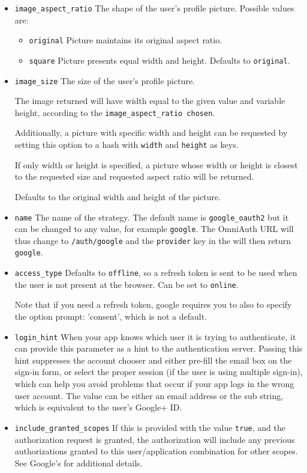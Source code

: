 \begin{itemize}
\item \verb|image_aspect_ratio| The shape of the user's profile
picture. Possible values are:

\begin{itemize}
\item \verb|original| Picture maintains its original aspect ratio.
\item \verb|square| Picture presents equal width and height.
Defaults to \verb|original|.
\end{itemize}

\item \verb|image_size| The size of the user's profile picture. 

The image
returned will have width equal to the given value and variable height,
according to the \verb|image_aspect_ratio chosen|. 

Additionally, a picture with
specific width and height can be requested by setting this option to a
hash with \verb|width| and \verb|height| as keys. 

If only width or height is specified,
a picture whose width or height is closest to the requested size and
requested aspect ratio will be returned. 

Defaults to the original width
and height of the picture.

\item \verb|name| The name of the strategy. 
The default name is
\verb|google_oauth2| but it can be changed to any value, for example \verb|google|. 
The
OmniAuth URL will thus change to \verb|/auth/google| 
and the \verb|provider| key in
the  will then return \verb|google|.

\item \verb|access_type| Defaults to \verb|offline|, 
so a refresh token is sent
to be used when the user is not present at the browser. Can be set to
\verb|online|. 

Note that if you need a refresh token, google requires you to
also to specify the option prompt: 'consent', which is not a default.

\item \verb|login_hint| When your app knows which user it is trying
to authenticate, it can provide this parameter as a hint to the
authentication server. Passing this hint suppresses the account chooser
and either pre-fill the email box on the sign-in form, or select the
proper session (if the user is using multiple sign-in), which can
help you avoid problems that occur if your app logs in the wrong user
account. The value can be either an email address or the sub string,
which is equivalent to the user's Google+ ID.

\item \verb|include_granted_scopes| 
If this is provided with the value
\verb|true|, and the authorization request is granted, the authorization will
include any previous authorizations granted to this user/application
combination for other scopes. See Google's 
for
additional details.
\end{itemize}

